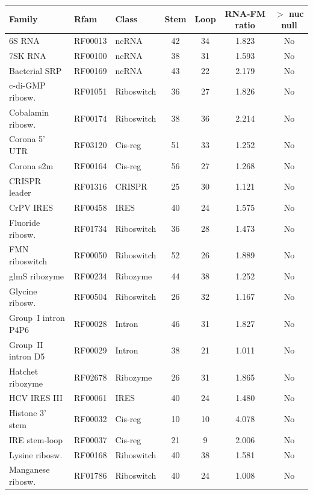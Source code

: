 \documentclass[11pt]{article}
\begin{document}
\begin{table}[h]
\centering
\small
\begin{tabular}{@{}lllcccc@{}}
\toprule
\textbf{Family} & \textbf{Rfam} & \textbf{Class} & \textbf{Stem} & \textbf{Loop} &
  \textbf{RNA-FM ratio} & \textbf{$>$ nuc null} \\
\midrule
6S RNA              & RF00013 & ncRNA       & 42 & 34 & 1.823 & No \\
7SK RNA             & RF00100 & ncRNA       & 38 & 31 & 1.593 & No \\
Bacterial SRP       & RF00169 & ncRNA       & 43 & 22 & 2.179 & No \\
c-di-GMP ribosw.    & RF01051 & Riboswitch  & 36 & 27 & 1.826 & No \\
Cobalamin ribosw.   & RF00174 & Riboswitch  & 38 & 36 & 2.214 & No \\
Corona 5' UTR       & RF03120 & Cis-reg     & 51 & 33 & 1.252 & No \\
Corona s2m          & RF00164 & Cis-reg     & 56 & 27 & 1.268 & No \\
CRISPR leader       & RF01316 & CRISPR      & 25 & 30 & 1.121 & No \\
CrPV IRES           & RF00458 & IRES        & 40 & 24 & 1.575 & No \\
Fluoride ribosw.    & RF01734 & Riboswitch  & 36 & 28 & 1.473 & No \\
FMN riboswitch      & RF00050 & Riboswitch  & 52 & 26 & 1.889 & No \\
glmS ribozyme       & RF00234 & Ribozyme    & 44 & 38 & 1.252 & No \\
Glycine ribosw.     & RF00504 & Riboswitch  & 26 & 32 & 1.167 & No \\
Group~I intron P4P6 & RF00028 & Intron      & 46 & 31 & 1.827 & No \\
Group~II intron D5  & RF00029 & Intron      & 38 & 21 & 1.011 & No \\
Hatchet ribozyme    & RF02678 & Ribozyme    & 26 & 31 & 1.865 & No \\
HCV IRES III        & RF00061 & IRES        & 40 & 24 & 1.480 & No \\
Histone 3' stem     & RF00032 & Cis-reg     & 10 & 10 & 4.078 & No \\
IRE stem-loop       & RF00037 & Cis-reg     & 21 &  9 & 2.006 & No \\
Lysine ribosw.      & RF00168 & Riboswitch  & 40 & 38 & 1.581 & No \\
Manganese ribosw.   & RF01786 & Riboswitch  & 40 & 24 & 1.008 & No \\

\end{tabular}
\end{table}
\end{document}
